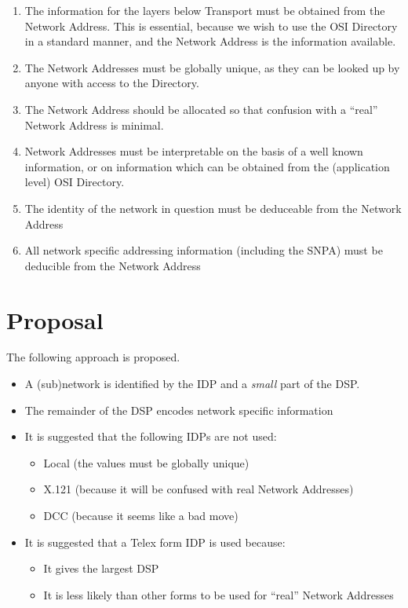 \begin {enumerate}
\item The information for the layers below Transport must be
obtained from the Network Address.  This is essential, because we
wish to use the OSI Directory in a standard manner, and the Network
Address is the information available.

\item The Network Addresses must be globally unique, as they can be
looked up by anyone with access to the Directory.

\item The Network Address should be allocated so that confusion with
a ``real'' Network Address is minimal.

\item Network Addresses must be interpretable on the basis of a
well known information, or on information which can be obtained from
the (application level) OSI Directory.

\item The identity of the network in question must be deduceable from
the Network Address

\item All network specific addressing information (including the
SNPA) must be deducible
from the Network Address
\end {enumerate}

\section {Proposal}

The following approach is proposed.  

\begin {itemize}
\item A (sub)network is identified by the IDP and a {\em small} part of
the DSP.

\item The remainder of the DSP encodes network specific information

\item It is suggested that the following IDPs are not used:
\begin {itemize}
\item Local (the values must be globally unique)
\item X.121 (because it will be confused with real Network Addresses)
\item DCC (because it seems like a bad move)
\end {itemize}

\item It is suggested that a Telex form IDP is used because:
\begin {itemize}
\item It gives the largest DSP
\item It is less likely than other forms to be used for ``real''
Network Addresses
\end {itemize}

\end {itemize}

